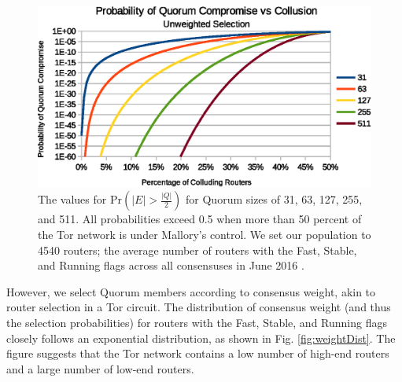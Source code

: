 \documentclass[USenglish,oneside,twocolumn]{article}
\begin{document}

\begin{figure}[h]
	\centering
	\includegraphics[width=\linewidth]{../assets/analysis/QuorumSelectionUnweighted.eps}
	\caption{The values for $ \mathrm{Pr}(\left\vert{E}\right\vert > \frac{\left\vert{Q}\right\vert}{2}) $ for Quorum sizes of 31, 63, 127, 255, and 511. All probabilities exceed 0.5 when more than 50 percent of the Tor network is under Mallory's control. We set our population to 4540 routers; the average number of routers with the Fast, Stable, and Running flags across all consensuses in June 2016 \cite{TorMetrics}.}
	\label{fig:quorumUnweightedMajority}
\end{figure}

However, we select Quorum members according to consensus weight, akin to router selection in a Tor circuit. The distribution of consensus weight (and thus the selection probabilities) for routers with the Fast, Stable, and Running flags closely follows an exponential distribution, as shown in Fig. \ref{fig:weightDist}. The figure suggests that the Tor network contains a low number of high-end routers and a large number of low-end routers.
\end{document}
